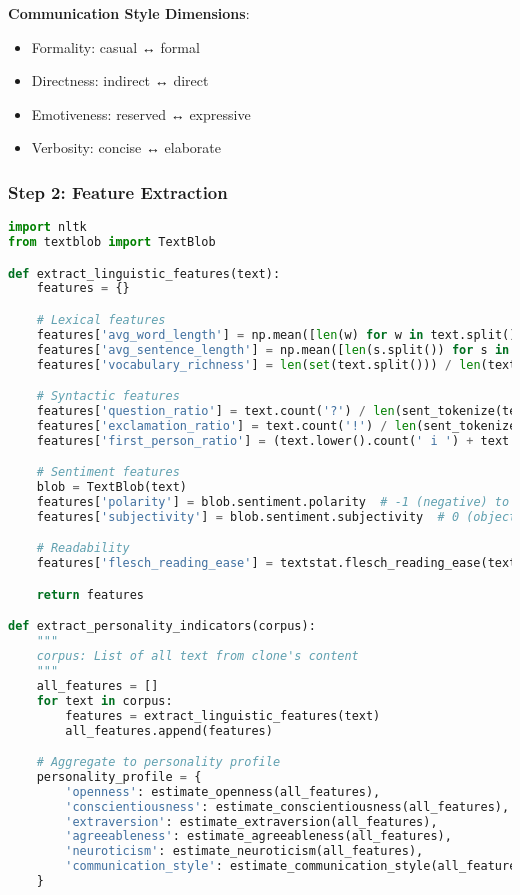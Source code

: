 \documentclass[10pt]{article}
\begin{document}
\textbf{Communication Style Dimensions}:
\begin{itemize}[leftmargin=*]
    \item Formality: casual ↔ formal
    \item Directness: indirect ↔ direct
    \item Emotiveness: reserved ↔ expressive
    \item Verbosity: concise ↔ elaborate
\end{itemize}

\subsubsection{Step 2: Feature Extraction}

\begin{lstlisting}[language=Python]
import nltk
from textblob import TextBlob

def extract_linguistic_features(text):
    features = {}

    # Lexical features
    features['avg_word_length'] = np.mean([len(w) for w in text.split()])
    features['avg_sentence_length'] = np.mean([len(s.split()) for s in sent_tokenize(text)])
    features['vocabulary_richness'] = len(set(text.split())) / len(text.split())

    # Syntactic features
    features['question_ratio'] = text.count('?') / len(sent_tokenize(text))
    features['exclamation_ratio'] = text.count('!') / len(sent_tokenize(text))
    features['first_person_ratio'] = (text.lower().count(' i ') + text.lower().count('my ')) / len(text.split())

    # Sentiment features
    blob = TextBlob(text)
    features['polarity'] = blob.sentiment.polarity  # -1 (negative) to 1 (positive)
    features['subjectivity'] = blob.sentiment.subjectivity  # 0 (objective) to 1 (subjective)

    # Readability
    features['flesch_reading_ease'] = textstat.flesch_reading_ease(text)

    return features

def extract_personality_indicators(corpus):
    """
    corpus: List of all text from clone's content
    """
    all_features = []
    for text in corpus:
        features = extract_linguistic_features(text)
        all_features.append(features)

    # Aggregate to personality profile
    personality_profile = {
        'openness': estimate_openness(all_features),
        'conscientiousness': estimate_conscientiousness(all_features),
        'extraversion': estimate_extraversion(all_features),
        'agreeableness': estimate_agreeableness(all_features),
        'neuroticism': estimate_neuroticism(all_features),
        'communication_style': estimate_communication_style(all_features)
    }


\end{lstlisting}
\end{document}
